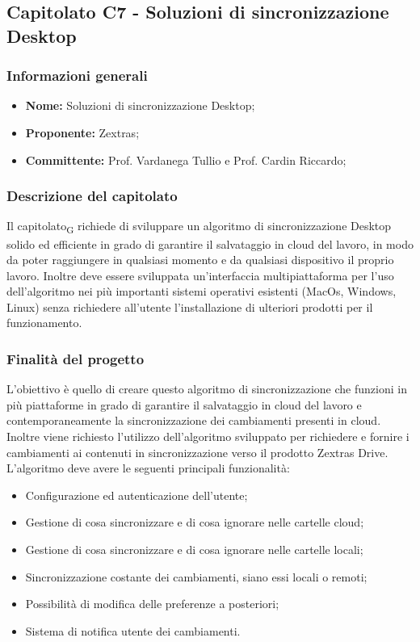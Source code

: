 \subsection{Capitolato C7 - Soluzioni di sincronizzazione Desktop}
\subsubsection{Informazioni generali}
	\begin{itemize}
	\item \textbf{Nome:} Soluzioni di sincronizzazione Desktop;
	\item \textbf{Proponente:} Zextras;
	\item \textbf{Committente:}  Prof. Vardanega Tullio e Prof. Cardin Riccardo;
	\end{itemize}
\subsubsection{Descrizione del capitolato}
Il \gls{capitolato}\textsubscript{G} richiede di sviluppare un algoritmo di sincronizzazione Desktop solido ed efficiente in grado di garantire il salvataggio in cloud del lavoro, in modo da poter raggiungere in qualsiasi momento e da qualsiasi dispositivo il proprio lavoro. Inoltre deve essere sviluppata un'interfaccia multipiattaforma per l'uso dell'algoritmo nei più importanti sistemi operativi esistenti (MacOs, Windows, Linux) senza richiedere all'utente l'installazione di ulteriori prodotti per il funzionamento.
\subsubsection{Finalità del progetto}
L'obiettivo è quello di creare questo algoritmo di sincronizzazione che funzioni in più piattaforme in grado di garantire il salvataggio in cloud del lavoro e contemporaneamente la sincronizzazione dei cambiamenti presenti in cloud. Inoltre viene richiesto l'utilizzo dell’algoritmo sviluppato per richiedere e fornire i cambiamenti ai contenuti in sincronizzazione verso il prodotto Zextras Drive.
L'algoritmo deve avere le seguenti principali funzionalità:
\begin{itemize}
\item {Configurazione ed autenticazione dell’utente};
\item {Gestione di cosa sincronizzare e di cosa ignorare nelle cartelle cloud};
\item {Gestione di cosa sincronizzare e di cosa ignorare nelle cartelle locali};
\item {Sincronizzazione costante dei cambiamenti, siano essi locali o remoti};
\item {Possibilità di modifica delle preferenze a posteriori};
\item {Sistema di notifica utente dei cambiamenti}.
\end{itemize}
